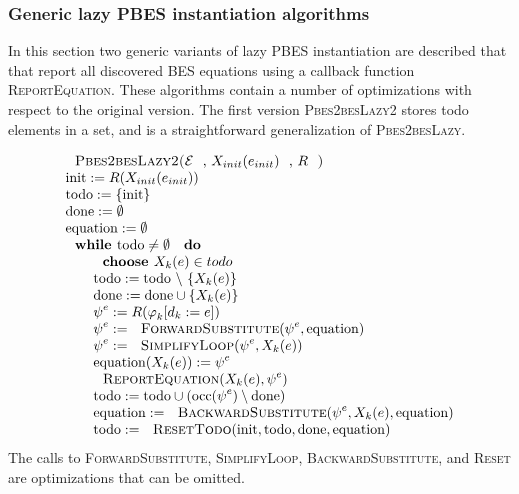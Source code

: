 \subsubsection{Generic lazy PBES instantiation algorithms}

In this section two generic variants of lazy PBES instantiation are described that that report all discovered BES
equations using a callback function \textsc{ReportEquation}. These algorithms contain a number of optimizations
with respect to the original version. The first version \textsc{Pbes2besLazy2} stores todo elements in a set,
and is a straightforward generalization of \textsc{Pbes2besLazy}.

\begin{equation*}
\begin{array}{l}
\text{\textsc{Pbes2besLazy2(}}\mathcal{E}\text{, }X_{init}(e_{init})\text{, }%
R\text{\textsc{)}} \\
\mathrm{init}:=R(X_{init}(e_{init})) \\
\mathrm{todo}:=\{\mathrm{init}\} \\
\mathrm{done}:=\emptyset  \\
\mathrm{equation}:=\emptyset  \\
\text{\textbf{while }}\mathrm{todo}\neq \emptyset \text{ \textbf{do}} \\
\qquad \text{\textbf{choose }}X_{k}(e)\in todo \\
\qquad \mathrm{todo}:=\mathrm{todo}\ \backslash \ \{X_{k}(e)\} \\
\qquad \mathrm{done}:=\mathrm{done}\cup \{X_{k}(e)\} \\
\qquad \psi ^{e}:=R(\varphi _{k}[d_{k}:=e]) \\
\qquad \psi ^{e}:=\text{\textsc{ForwardSubstitute}}(\psi ^{e},\mathrm{%
equation}) \\
\qquad \psi ^{e}:=\text{\textsc{SimplifyLoop}}(\psi ^{e},X_{k}(e)) \\
\qquad \mathrm{equation}(X_{k}(e)):=\psi ^{e} \\
\qquad \text{\textsc{ReportEquation}}(X_{k}(e),\psi ^{e}) \\
\qquad \mathrm{todo}:=\mathrm{todo}\cup (\mathrm{occ}(\psi ^{e})\setminus
\mathrm{done}) \\
\qquad \mathrm{equation}:=\text{\textsc{BackwardSubstitute}}(\psi
^{e},X_{k}(e),\mathrm{equation}) \\
\qquad \mathrm{todo}:=\text{\textsc{ResetTodo}}(\mathrm{init},\mathrm{todo},%
\mathrm{done},\mathrm{equation})%
\end{array}%
\end{equation*}%
The calls to \textsc{ForwardSubstitute}, \textsc{SimplifyLoop}, \textsc{%
BackwardSubstitute}, and \textsc{Reset} are optimizations that can be
omitted.

